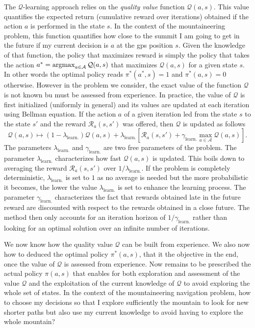 The $\mathcal{Q}$-learning approach relies on the \textit{quality value} function $\mathcal{Q}(a, s)$.
This value quantifies the expected return (cumulative reward over iterations) obtained if the action $a$ is performed in the state $s$.
In the context of the mountaineering problem, this function quantifies how close to the summit I am going to get in the future if my current decision is $a$ at the gps position $s$.
Given the knowledge of that function, the policy that maximizes reward is simply the policy that takes the action $a^* = \operatorname{argmax}_{a \in \mathcal{A}} \mathcal{Q}(a, s)$ that maximizes $\mathcal{Q}(a, s)$ for a given state $s$.
In other words the optimal policy reads $\pi^*(a^*, s) = 1$ and $\pi^*(a, s) = 0$ otherwise.
However in the problem we consider, the exact value of the function $\mathcal{Q}$ is not known bu must be assessed from experience.
In practice, the value of $\mathcal{Q}$ is first initialized (uniformly in general) and its values are updated at each iteration using Bellman equation.
If the action $a$ of a given iteration led from the state $s$ to the state $s'$ and the reward $\mathcal{R}_a(s, s')$ was offered, then $\mathcal{Q}$ is updated as follows
\begin{equation}
	\mathcal{Q}(a, s) \mapsto (1 - \lambda_{\mathrm{learn.}}) \mathcal{Q}(a, s) + \lambda_{\mathrm{learn.}} \left[ \mathcal{R}_a(s, s') + \gamma_{\mathrm{learn.}} \max_{a \in \mathcal{A}} \mathcal{Q}(a, s) \right].
\end{equation}
The parameters $\lambda_{\mathrm{learn.}}$ and $\gamma_{\mathrm{learn.}}$ are two free parameters of the problem.
The parameter $\lambda_{\mathrm{learn.}}$ characterizes how fast $\mathcal{Q}(a, s)$ is updated.
This boils down to averaging the reward $\mathcal{R}_a(s, s')$ over $1/\lambda_{\mathrm{learn.}}$.
If the problem is completely deterministic, $\lambda_{\mathrm{learn.}}$ is set to $1$ as no average is needed but the more probabilistic it becomes, the lower the value $\lambda_{\mathrm{learn.}}$ is set to enhance the learning process.
The parameter $\gamma_{\mathrm{learn.}}$ characterizes the fact that rewards obtained late in the future reward are discounted with respect to the rewards obtained in a close future.
The method then only accounts for an iteration horizon of $1/\gamma_{\mathrm{learn.}}$ rather than looking for an optimal solution over an infinite number of iterations.

We now know how the quality value $\mathcal{Q}$ can be built from experience.
We also now how to deduced the optimal policy $\pi^*(a, s)$, that it the objective in the end, once the value of $\mathcal{Q}$ is assessed from experience.
Now remains to be prescribed the actual policy $\pi(a, s)$ that enables for both exploration and assessment of the value $\mathcal{Q}$ and the exploitation of the current knowledge of $\mathcal{Q}$ to avoid exploring the whole set of states.
In the context of the mountaineering navigation problem, how to choose my decisions so that I explore sufficiently the mountain to look for new shorter paths but also use my current knowledge to avoid having to explore the whole mountain?


